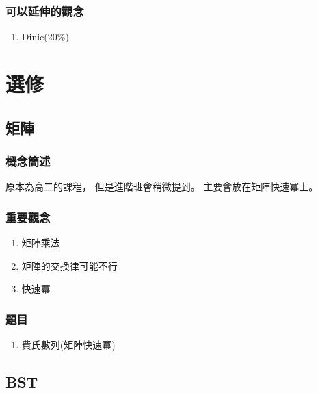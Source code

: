 \documentclass[12pt,oneside]{article}
\begin{document}
\subsubsection*{可以延伸的觀念}
\begin{adjustwidth}{2em}{0em}
\begin{enumerate}
    \item Dinic(20\%)
\end{enumerate}
\end{adjustwidth}

\clearpage



\section{選修}

\subsection{矩陣}
\subsubsection*{概念簡述}

原本為高二的課程，
但是進階班會稍微提到。
主要會放在矩陣快速冪上。


\subsubsection*{重要觀念}
\begin{adjustwidth}{2em}{0em}
\begin{enumerate}
    \item 矩陣乘法
    \item 矩陣的交換律可能不行
    \item 快速冪
\end{enumerate}
\end{adjustwidth}

\subsubsection*{題目}
\begin{adjustwidth}{2em}{0em}
\begin{enumerate}
    \item 費氏數列(矩陣快速冪)
\end{enumerate}
\end{adjustwidth}
\clearpage


\subsection{BST}
\end{document}
